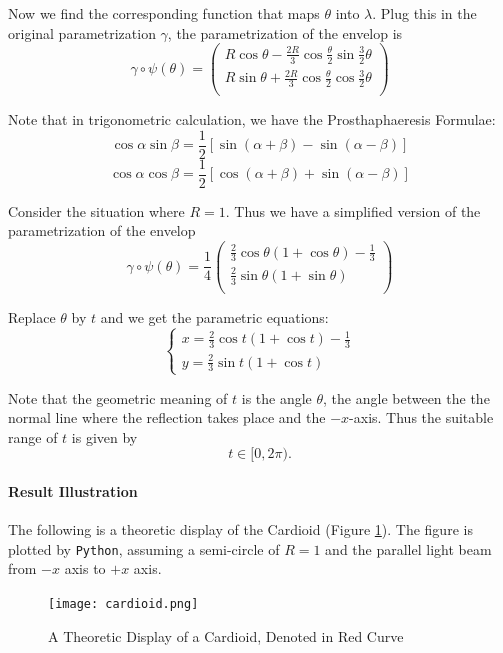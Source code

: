 \documentclass[a4paper]{article}
\begin{document}
Now we find the corresponding function that maps $\theta$ into $\lambda$. Plug this in the original parametrization $\gamma$, the parametrization of the envelop is
$$\gamma \circ \psi(\theta) =
\begin{pmatrix}
R\cos \theta - \frac{2R}{3}\cos \frac{\theta}{2} \sin \frac{3}{2}\theta\\
R\sin \theta + \frac{2R}{3}\cos \frac{\theta}{2} \cos \frac{3}{2}\theta\\
\end{pmatrix}$$

Note that in trigonometric calculation, we have the Prosthaphaeresis Formulae:
$$\cos \alpha \sin \beta = \frac{1}{2}[\sin (\alpha+\beta)-\sin(\alpha-\beta)]$$
$$\cos \alpha \cos \beta = \frac{1}{2}[\cos (\alpha+\beta)+\sin(\alpha-\beta)]$$

Consider the situation where $R=1$. Thus we have a simplified version of the parametrization of the envelop
$$\gamma \circ \psi(\theta) = \frac{1}{4}
\begin{pmatrix}
\frac{2}{3}\cos \theta (1+\cos \theta)-\frac{1}{3}\\
\frac{2}{3}\sin \theta (1+\sin \theta)\\
\end{pmatrix}$$

Replace $\theta$ by $t$ and we get the parametric equations:
\begin{equation*}
\left\lbrace
	\begin{aligned}
	x = \frac{2}{3}\cos t (1+\cos t)-\frac{1}{3}\\
	y = \frac{2}{3}\sin t (1+\cos t)
	\end{aligned}
\right.
\end{equation*}

Note that the geometric meaning of $t$ is the angle $\theta$, the angle between the the normal line where the reflection takes place and the $-x$-axis. Thus the suitable range of $t$ is given by 
$$t \in [0,2\pi).$$

\paragraph{Result Illustration}
The following is a theoretic display of the Cardioid (Figure \ref{fig:cardioid}). The figure is plotted by \texttt{Python}, assuming a semi-circle of $R=1$ and the parallel light beam from $-x$ axis to $+x$ axis.

\begin{figure}[!htbp]
	\centering
	\texttt{[image: cardioid.png]}
	\caption{A Theoretic Display of a Cardioid, Denoted in Red Curve}
	\label{fig:cardioid}
\end{figure}
\end{document}
